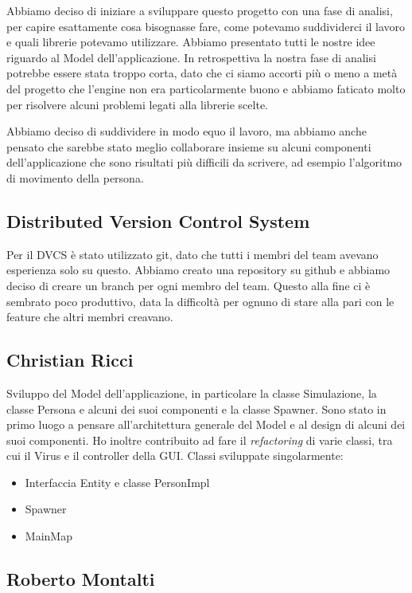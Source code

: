 Abbiamo deciso di iniziare a sviluppare questo progetto con una fase di analisi, per capire esattamente cosa bisognasse fare, come potevamo suddividerci il lavoro e quali librerie potevamo utilizzare. Abbiamo presentato tutti le nostre idee riguardo al Model dell'applicazione. In retrospettiva la nostra fase di analisi potrebbe essere stata troppo corta, dato che ci siamo accorti più o meno a metà del progetto che l'engine non era particolarmente buono e abbiamo faticato molto per risolvere alcuni problemi legati alla librerie scelte.

Abbiamo deciso di suddividere in modo equo il lavoro, ma abbiamo anche pensato che sarebbe stato meglio collaborare insieme su alcuni componenti dell'applicazione che sono risultati più difficili da scrivere, ad esempio l'algoritmo di movimento della persona.

\subsection{Distributed Version Control System}

Per il DVCS è stato utilizzato git, dato che tutti i membri del team avevano esperienza solo su questo. Abbiamo creato una repository su github e abbiamo deciso di creare un branch per ogni membro del team. Questo alla fine ci è sembrato poco produttivo, data la difficoltà per ognuno di stare alla pari con le feature che altri membri creavano.

\subsection{Christian Ricci}

Sviluppo del Model dell'applicazione, in particolare la classe Simulazione, la classe Persona e alcuni dei suoi componenti e la classe Spawner. Sono stato in primo luogo a pensare all'architettura generale del Model e al design di alcuni dei suoi componenti. Ho inoltre contribuito ad fare il \textit{refactoring} di varie classi, tra cui il Virus e il controller della GUI.
Classi sviluppate singolarmente:
\begin{itemize}
\item Interfaccia Entity e classe PersonImpl
\item Spawner
\item MainMap
\end{itemize}

\subsection{Roberto Montalti}

